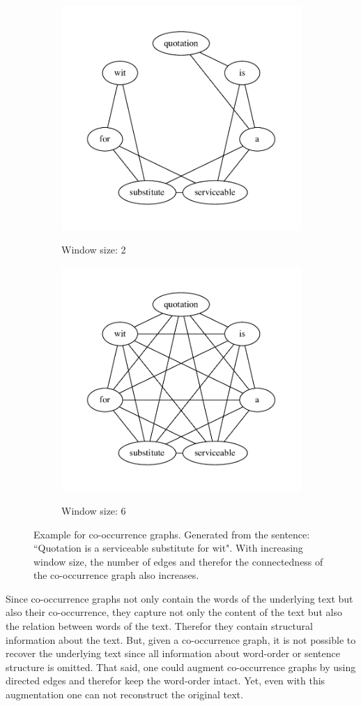 \begin{figure}[htb!]
\begin{subfigure}[t]{0.32\linewidth}{\includegraphics[width=\linewidth]{assets/figures/cooccurrence/window_size_2.pdf}}
    \caption{Window size: 2}%
    \end{subfigure}
    \begin{subfigure}[t]{0.32\linewidth}{\includegraphics[width=\linewidth]{assets/figures/cooccurrence/window_size_6.pdf}}%
    \caption{Window size: 6}%
    \end{subfigure}
    \caption[Example: Co-Occurrence Graph]{Example for co-occurrence graphs. Generated from the sentence: ``Quotation is a serviceable substitute for wit". With increasing window size, the number of edges and therefor the connectedness of the co-occurrence graph also increases.}%
    \label{fig:cooccurrence_graphs}%
\end{figure}


Since co-occurrence graphs not only contain the words of the underlying text but also their co-occurrence, they capture not only the content of the text but also the relation between words of the text.
Therefor they contain structural information about the text.
But, given a co-occurrence graph, it is not possible to recover the underlying text since all information about word-order or sentence structure is omitted.
That said, one could augment co-occurrence graphs by using directed edges and therefor keep the word-order intact.
Yet, even with this augmentation one can not reconstruct the original text.

